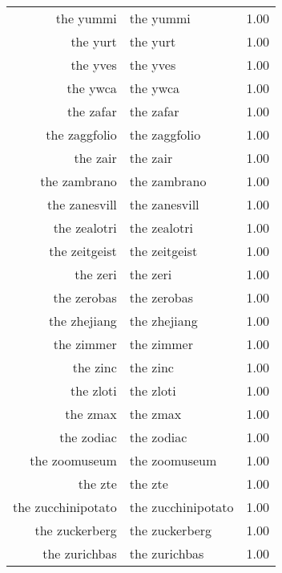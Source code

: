 \begin{table}[ht]
\begin{tabular}{rlr}
  the yummi & the yummi & 1.00 \\ 
  the yurt & the yurt & 1.00 \\ 
  the yves & the yves & 1.00 \\ 
  the ywca & the ywca & 1.00 \\ 
  the zafar & the zafar & 1.00 \\ 
  the zaggfolio & the zaggfolio & 1.00 \\ 
  the zair & the zair & 1.00 \\ 
  the zambrano & the zambrano & 1.00 \\ 
  the zanesvill & the zanesvill & 1.00 \\ 
  the zealotri & the zealotri & 1.00 \\ 
  the zeitgeist & the zeitgeist & 1.00 \\ 
  the zeri & the zeri & 1.00 \\ 
  the zerobas & the zerobas & 1.00 \\ 
  the zhejiang & the zhejiang & 1.00 \\ 
  the zimmer & the zimmer & 1.00 \\ 
  the zinc & the zinc & 1.00 \\ 
  the zloti & the zloti & 1.00 \\ 
  the zmax & the zmax & 1.00 \\ 
  the zodiac & the zodiac & 1.00 \\ 
  the zoomuseum & the zoomuseum & 1.00 \\ 
  the zte & the zte & 1.00 \\ 
  the zucchinipotato & the zucchinipotato & 1.00 \\ 
  the zuckerberg & the zuckerberg & 1.00 \\ 
  the zurichbas & the zurichbas & 1.00 \\ 
   \hline
\end{tabular}
\end{table}
